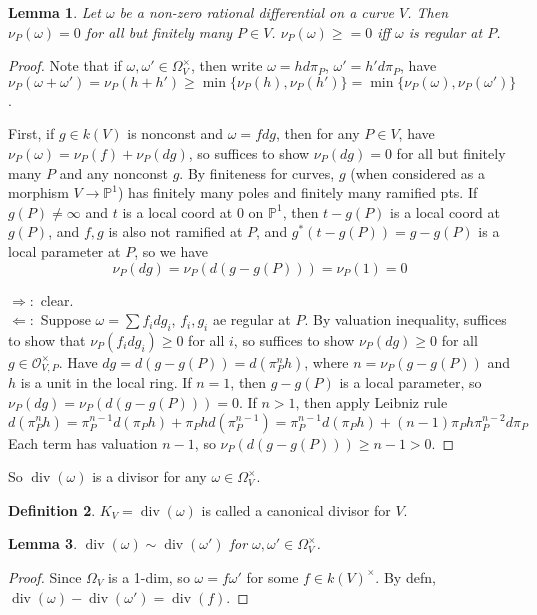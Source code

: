 \documentclass{article}
\theoremstyle{definition}
\newtheorem{defn}{Definition}[section]
\theoremstyle{remark}
\theoremstyle{plain}
\newtheorem{lem}[defn]{Lemma}
\newcommand{\PP}{\mathbb{P}}
\newcommand{\divi}{\operatorname{div}}
\begin{document}
\begin{lem}
    Let $\omega$ be a non-zero rational differential on a curve $V$. Then $\nu_P(\omega)=0$ for all but finitely many $P\in V$. $\nu_P(\omega)\ge=0$ iff $\omega$ is regular at $P$.
\end{lem}
\begin{proof}
    Note that if $\omega,\omega'\in\Omega_V^\times$, then write $\omega=hd\pi_P$, $\omega'=h'd\pi_P$, have $\nu_P(\omega+\omega')=\nu_P(h+h')\ge\min\{\nu_P(h),\nu_P(h')\}=\min\{\nu_P(\omega),\nu_P(\omega')\}$.

    First, if $g\in k(V)$ is nonconst and $\omega=fdg$, then for any $P\in V$, have $\nu_P(\omega)=\nu_P(f)+\nu_P(dg)$, so suffices to show $\nu_P(dg)=0$ for all but finitely many $P$ and any nonconst $g$. By finiteness for curves, $g$ (when considered as a morphism $V\to\PP^1$) has finitely many poles and finitely many ramified pts. If $g(P)\neq\infty$ and $t$ is a local coord at $0$ on $\PP^1$, then $t-g(P)$ is a local coord at $g(P)$, and $f,g$ is also not ramified at $P$, and $g^\ast(t-g(P))=g-g(P)$ is a local parameter at $P$, so we have
    \[\nu_P(dg)=\nu_P(d(g-g(P)))=\nu_P(1)=0\]

    $\Rightarrow:$ clear.\\
    $\Leftarrow:$ Suppose $\omega=\sum f_idg_i$, $f_i,g_i$ ae regular at $P$. By valuation inequality, suffices to show that $\nu_P(f_idg_i)\ge 0$ for all $i$, so suffices to show $\nu_P(dg)\ge 0$ for all $g\in \mathcal O_{V,P}^\times$. Have $dg=d(g-g(P))=d(\pi_P^nh)$, where $n=\nu_P(g-g(P))$ and $h$ is a unit in the local ring. If $n=1$, then $g-g(P)$ is a local parameter, so $\nu_P(dg)=\nu_P(d(g-g(P)))=0$. If $n>1$, then apply Leibniz rule
    \[d(\pi_P^nh)=\pi_P^{n-1}d(\pi_Ph)+\pi_Phd(\pi_P^{n-1})=\pi_P^{n-1}d(\pi_Ph)+(n-1)\pi_Ph\pi_P^{n-2}d\pi_P\]
    Each term has valuation $n-1$, so $\nu_P(d(g-g(P)))\ge n-1>0$.
\end{proof}
So $\divi(\omega)$ is a divisor for any $\omega\in\Omega_V^\times$.
\begin{defn}
    $K_V=\divi(\omega)$ is called a canonical divisor for $V$.
\end{defn}
\begin{lem}
    $\divi(\omega)\sim\divi(\omega')$ for $\omega,\omega'\in\Omega_V^\times$.
\end{lem}
\begin{proof}
    Since $\Omega_V$ is a 1-dim, so $\omega=f\omega'$ for some $f\in k(V)^\times$. By defn, $\divi(\omega)-\divi(\omega')=\divi(f)$.
\end{proof}
\end{document}
